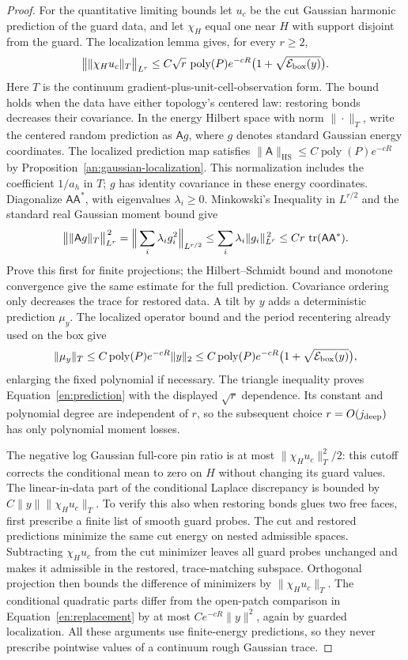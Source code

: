 \begin{proof}
For the quantitative limiting bounds let $u_c$ be the cut Gaussian
harmonic prediction of the guard data, and let $\chi_H$ equal one
near $H$ with support disjoint from the guard.  The localization
lemma gives, for every $r\geq2$,
\begin{equation}\label{en:prediction}
 \big\|\|\chi_Hu_c\|_T\big\|_{L^r}
 \leq C\sqrt r\,\operatorname{poly}(P)
 e^{-cR}\bigl(1+\sqrt{\mathcal E_{\rm box}(y)}\bigr).
\end{equation}
Here $T$ is the continuum gradient-plus-unit-cell-observation form.
The bound holds when the data have either topology's centered law:
restoring bonds decreases their covariance.  In the energy Hilbert
space with norm $\|\cdot\|_T$, write the centered random prediction as
$\mathsf A g$, where $g$ denotes standard Gaussian energy coordinates.
The localized prediction map satisfies
$\|\mathsf A\|_{\mathrm{HS}}\leq
C\operatorname{poly}(P)e^{-cR}$ by
Proposition~\ref{an:gaussian-localization}.  This normalization includes
the coefficient $1/a_h$ in $T$; $g$ has identity covariance in these
energy coordinates.  Diagonalize $\mathsf A\mathsf A^*$, with
eigenvalues $\lambda_i\geq0$.  Minkowski's Inequality in $L^{r/2}$
and the standard real Gaussian moment bound give
\[
 \big\|\|\mathsf A g\|_T\big\|_{L^r}^{\,2}
 =\Big\|\sum_i\lambda_i g_i^2\Big\|_{L^{r/2}}
 \leq\sum_i\lambda_i\|g_i\|_{L^r}^{\,2}
 \leq Cr\,\operatorname{tr}(\mathsf A\mathsf A^*).
\]
Prove this first for finite projections; the Hilbert--Schmidt bound
and monotone convergence give the same estimate for the full
prediction.  Covariance ordering only decreases the trace for restored
data.  A tilt by $y$ adds a deterministic prediction $\mu_y$.
The localized operator bound and the period recentering already used
on the box give
\[
 \|\mu_y\|_T\leq C\operatorname{poly}(P)e^{-cR}\|y\|_2
 \leq C\operatorname{poly}(P)e^{-cR}
              \bigl(1+\sqrt{\mathcal E_{\rm box}(y)}\bigr),
\]
enlarging the fixed polynomial if necessary.  The triangle inequality
proves Equation~\eqref{en:prediction} with the displayed $\sqrt r$
dependence.  Its constant and polynomial degree are independent of
$r$, so the subsequent choice $r=O(j_{\rm deep})$ has only polynomial
moment losses.

The negative log Gaussian full-core pin ratio is at most
$\|\chi_Hu_c\|_T^2/2$: this cutoff corrects the conditional mean
to zero on $H$ without changing its guard values.  The linear-in-data
part of the conditional Laplace discrepancy is bounded by
$C\|y\|\|\chi_Hu_c\|_T$.  To verify this also when restoring bonds
glues two free faces, first prescribe a finite list of smooth guard
probes.  The cut and restored predictions minimize the same cut
energy on nested admissible spaces.  Subtracting $\chi_Hu_c$ from
the cut minimizer leaves all guard probes unchanged and makes it
admissible in the restored, trace-matching subspace.  Orthogonal
projection then bounds the difference of minimizers by
$\|\chi_Hu_c\|_T$.  The conditional quadratic parts differ from the
open-patch comparison in Equation~\eqref{en:replacement} by at most
$Ce^{-cR}\|y\|^2$, again by guarded localization.  All these arguments
use finite-energy predictions, so they never prescribe pointwise
values of a continuum rough Gaussian trace.


\end{proof}
